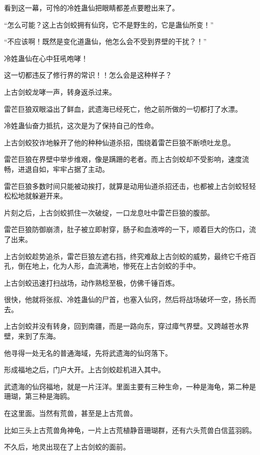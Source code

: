 
\begin{this_body}

看到这一幕，可怜的冷姓蛊仙把眼睛都差点要瞪出来了。

“怎么可能？这上古剑蛟拥有仙窍，它不是野生的，它是蛊仙所变！”

“不应该啊！既然是变化道蛊仙，他怎么会不受到界壁的干扰？！”

冷姓蛊仙在心中狂吼咆哮！

这一切都违反了修行界的常识！！怎么会是这种样子？

上古剑蛟龙哮一声，转身返杀过来。

雷芒巨狼双眼溢出了鲜血，武遗海已经死亡，他之前所做的一切都打了水漂。

冷姓蛊仙奋力抵抗，这次是为了保持自己的性命。

上古剑蛟狡诈地躲开了他的种种仙道杀招，围绕着雷芒巨狼不断喷吐龙息。

雷芒巨狼在界壁中举步维艰，像是蹒跚的老者。而上古剑蛟却不受影响，速度流畅，进退自如，牢牢占据了主动。

雷芒巨狼多数时间只能被动挨打，就算是动用仙道杀招还击，也都被上古剑蛟轻轻松松地就躲避开来。

片刻之后，上古剑蛟抓住一次破绽，一口龙息吐中雷芒巨狼的腹部。

雷芒巨狼防御崩溃，肚子被立即射穿，肠子和血液哗的一下，顺着巨大的伤口，流了出来。

上古剑蛟趁势追杀，雷芒巨狼左遮右挡，终究难敌上古剑蛟的威势，最终它千疮百孔，倒在地上，化为人形，血流满地，惨死在上古剑蛟的手中。

上古剑蛟迅速打扫战场，动作熟稔至极，仿佛千锤百炼。

很快，他就将张叔、冷姓蛊仙的尸首，也塞入仙窍，然后将战场破坏一空，扬长而去。

上古剑蛟并没有转身，回到南疆，而是一路向东，穿过瘴气界壁。又跨越苍水界壁，来到了东海。

他寻得一处无名的普通海域，先将武遗海的仙窍落下。

形成福地之后，门户大开。上古剑蛟趁机进入其中。

武遗海的仙窍福地，就是一片汪洋。里面主要有三种生命，一种是海龟，第二种是珊瑚，第三种是海鸥。

在这里面。当然有荒兽，甚至是上古荒兽。

比如三头上古荒兽角神龟，一片上古荒植静音珊瑚群，还有六头荒兽白信蓝羽鸥。

不久后，地灵出现在了上古剑蛟的面前。


\end{this_body}

